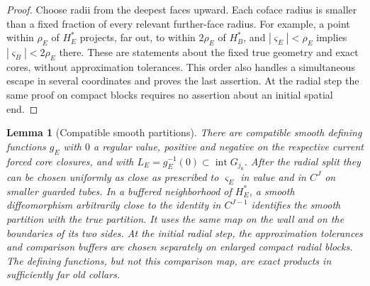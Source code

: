 \documentclass[11pt]{article}
\numberwithin{equation}{section}
\newtheorem{lemma}[theorem]{Lemma}
\theoremstyle{definition}
\theoremstyle{remark}
\begin{document}
\begin{proof}
Choose radii from the deepest faces upward.  Each coface radius is
smaller than a fixed fraction of every relevant further-face radius.
For example, a point within $\rho_E$ of $H_E^*$ projects, far out, to
within $2\rho_E$ of $H_B^*$, and $|\varsigma_E|<\rho_E$ implies
$|\varsigma_B|<2\rho_E$ there.  These are statements about the fixed true
geometry and exact cores, without approximation tolerances.  This order
also handles a simultaneous escape in several coordinates and proves the
last assertion.  At the radial step the same proof on compact blocks
requires no assertion about an initial spatial end.
\end{proof}

\begin{lemma}[Compatible smooth partitions]\label{regular:partition}
There are compatible smooth defining functions $g_E$ with $0$ a regular
value, positive and negative on the respective current forced core
closures, and with $L_E=g_E^{-1}(0)\subset\operatorname{int}G_{j_0}$.
After the radial split they can be chosen uniformly as close as
prescribed to $\varsigma_E$ in value and in $C^J$ on smaller guarded
tubes.  In a buffered neighborhood of $H_E^*$, a smooth diffeomorphism
arbitrarily close to the identity in $C^{J-1}$ identifies the smooth
partition with the true partition.  It uses the same map on the wall
and on the boundaries of its two sides.  At the initial radial step,
the approximation tolerances and comparison buffers are chosen separately
on enlarged compact radial blocks.  The defining functions, but not this
comparison map, are exact products in sufficiently far old collars.
\end{lemma}
\end{document}
